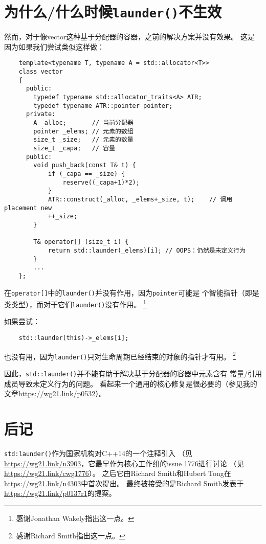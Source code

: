 \section{为什么/什么时候\texttt{launder()}不生效}
然而，对于像vector这种基于分配器的容器，之前的解决方案并没有效果。
这是因为如果我们尝试类似这样做：
\begin{lstlisting}
    template<typename T, typename A = std::allocator<T>>
    class vector
    {
      public:
        typedef typename std::allocator_traits<A> ATR;
        typedef typename ATR::pointer pointer;
      private:
        A _alloc;       // 当前分配器
        pointer _elems; // 元素的数组
        size_t _size;   // 元素的数量
        size_t _capa;   // 容量
      public:
        void push_back(const T& t) {
            if (_capa == _size) {
                reserve((_capa+1)*2);
            }
            ATR::construct(_alloc, _elems+_size, t);    // 调用placement new
            ++_size;
        }

        T& operator[] (size_t i) {
            return std::launder(_elems)[i]; // OOPS：仍然是未定义行为
        }
        ...
    };
\end{lstlisting}
在\texttt{operator[]}中的\texttt{launder()}并没有作用，因为\texttt{pointer}可能是
个智能指针（即是类类型），而对于它们\texttt{launder()}没有作用。
\footnote{感谢Jonathan Wakely指出这一点。}

如果尝试：
\begin{lstlisting}
    std::launder(this)->_elems[i];
\end{lstlisting}
也没有用，因为\texttt{launder()}只对生命周期已经结束的对象的指针才有用。
\footnote{感谢Richard Smith指出这一点。}

因此，\texttt{std::launder()}并不能有助于解决基于分配器的容器中元素含有
常量/引用成员导致未定义行为的问题。
看起来一个通用的核心修复是很必要的（参见我的文章\url{https://wg21.link/p0532}）。


\section{后记}
\texttt{std:launder()}作为国家机构对C++14的一个注释引入
（见\url{https://wg21.link/n3903}，它最早作为核心工作组的issue 1776进行讨论
（见\url{https://wg21.link/cwg1776}）。
之后它由Richard Smith和Hubert Tong在\url{https://wg21.link/n4303}中首次提出。
最终被接受的是Richard Smith发表于\url{https://wg21.link/p0137r1}的提案。